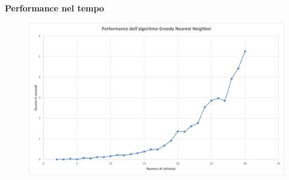 \documentclass[9pt]{beamer}
\begin{document}
\begin{frame}[allowframebreaks]{\subsecname}
	\textbf{Performance nel tempo}
      	\begin{figure}[h]
	\centering
	\includegraphics[width=\textwidth]
	{../charts/06 Performance dell'algoritmo Greedy Nearest Neighbor}
	\end{figure}

\end{frame}
\end{document}
